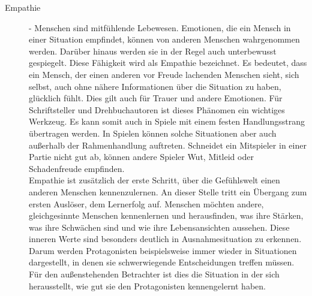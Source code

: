 \begin{description}
\item[Empathie] - Menschen sind mitfühlende Lebewesen. Emotionen, die ein Mensch in einer Situation empfindet, können von anderen Menschen wahrgenommen werden. Darüber hinaus werden sie in der Regel auch unterbewusst gespiegelt. Diese Fähigkeit wird als Empathie bezeichnet. Es bedeutet, dass ein Mensch, der einen anderen vor Freude lachenden Menschen sieht, sich selbst, auch ohne nähere Informationen über die Situation zu haben, glücklich fühlt. Dies gilt auch für Trauer und andere Emotionen. Für Schriftsteller und Drehbuchautoren ist dieses Phänomen ein wichtiges Werkzeug. Es kann somit auch in Spiele mit einem festen Handlungsstrang übertragen werden. In Spielen können solche Situationen aber auch außerhalb der Rahmenhandlung auftreten. Schneidet ein Mitspieler in einer Partie nicht gut ab, können andere Spieler Wut, Mitleid oder Schadenfreude empfinden. \cite[S. 21 f.]{Adams:1515529}\\
Empathie ist zusätzlich der erste Schritt, über die Gefühlswelt einen anderen Menschen kennenzulernen. An dieser Stelle tritt ein Übergang zum ersten Auslöser, dem Lernerfolg auf. Menschen möchten andere, gleichgesinnte Menschen kennenlernen und herausfinden, was ihre Stärken, was ihre Schwächen sind und wie ihre Lebensansichten aussehen. Diese inneren Werte sind besonders deutlich in Ausnahmesituation zu erkennen. Darum werden Protagonisten beispielsweise immer wieder in Situationen dargestellt, in denen sie schwerwiegende Entscheidungen treffen müssen. Für den außenstehenden Betrachter ist dies die Situation in der sich herausstellt, wie gut sie den Protagonisten kennengelernt haben. \cite[S. 21 f.]{Adams:1515529}
% 
%
%




\end{description}
